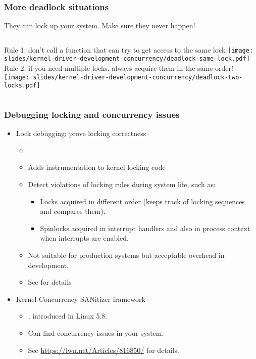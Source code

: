 \begin{frame}
  \frametitle{More deadlock situations} They can lock up your system. Make sure they never happen!
  \vspace{0.5cm}
  \begin{columns}
      Rule 1: don't call a function that can try to get access to the same lock
      \texttt{[image: slides/kernel-driver-development-concurrency/deadlock-same-lock.pdf]}
      Rule 2: if you need multiple locks, always acquire them in the same order!
      \texttt{[image: slides/kernel-driver-development-concurrency/deadlock-two-locks.pdf]}
  \end{columns}
\end{frame}

\begin{frame}
  \frametitle{Debugging locking and concurrency issues}
  \begin{itemize}
  \item Lock debugging: prove locking correctness
    \begin{itemize}
    \item {}
    \item Adds instrumentation to kernel locking code
    \item Detect violations of locking rules during system life, such as:
      \begin{itemize}
      \item Locks acquired in different order (keeps track of locking
        sequences and compares them).
      \item Spinlocks acquired in interrupt handlers and also in
        process context when interrupts are enabled.
      \end{itemize}
    \item Not suitable for production systems but acceptable overhead
      in development.
    \item See  for details
    \end{itemize}
  \item Kernel Concurrency SANitizer framework
     \begin{itemize}
     \item {}, introduced in Linux 5.8.
     \item Can find concurrency issues in your system.
     \item See \url{https://lwn.net/Articles/816850/} for details.
     \end{itemize}
  \end{itemize}
\end{frame}

